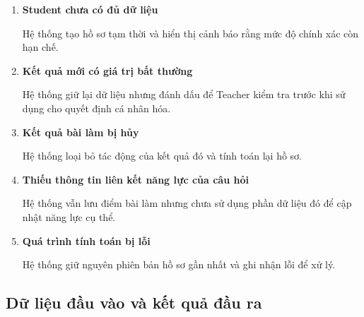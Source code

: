 \begin{enumerate}[label=\textbf{A\arabic*.}]
	\item \textbf{Student chưa có đủ dữ liệu}
	
	Hệ thống tạo hồ sơ tạm thời và hiển thị cảnh báo rằng mức độ chính
	xác còn hạn chế.
	
	\item \textbf{Kết quả mới có giá trị bất thường}
	
	Hệ thống giữ lại dữ liệu nhưng đánh dấu để Teacher kiểm tra trước khi
	sử dụng cho quyết định cá nhân hóa.
	
	\item \textbf{Kết quả bài làm bị hủy}
	
	Hệ thống loại bỏ tác động của kết quả đó và tính toán lại hồ sơ.
	
	\item \textbf{Thiếu thông tin liên kết năng lực của câu hỏi}
	
	Hệ thống vẫn lưu điểm bài làm nhưng chưa sử dụng phần dữ liệu đó để
	cập nhật năng lực cụ thể.
	
	\item \textbf{Quá trình tính toán bị lỗi}
	
	Hệ thống giữ nguyên phiên bản hồ sơ gần nhất và ghi nhận lỗi để xử lý.
\end{enumerate}

\subsection{Dữ liệu đầu vào và kết quả đầu ra}

